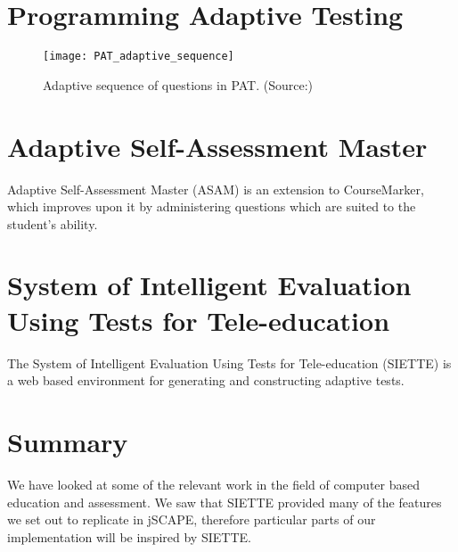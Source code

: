 \section{Programming Adaptive Testing}
\begin{figure}[H]
\centering
\texttt{[image: PAT\_adaptive\_sequence]}
\caption{Adaptive sequence of questions in PAT. (Source:\cite{PAT})}
\label{fig:PAT_adaptive_sequence}
\end{figure}

\section{Adaptive Self-Assessment Master}
Adaptive Self-Assessment Master (ASAM) is an extension to CourseMarker, which improves upon it by administering questions which are suited to the student's ability.

\section{System of Intelligent Evaluation Using Tests for Tele-education}
The System of Intelligent Evaluation Using Tests for Tele-education (SIETTE) is a web based environment for generating and constructing adaptive tests.

\section{Summary}
We have looked at some of the relevant work in the field of computer based education and assessment. We saw that SIETTE provided many of the features we set out to replicate in jSCAPE, therefore particular parts of our implementation will be inspired by SIETTE.
